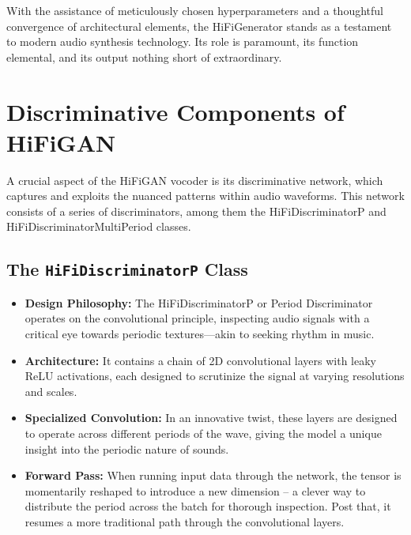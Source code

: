 \documentclass[a4paper]{article}
\begin{document}
With the assistance of meticulously chosen hyperparameters and a thoughtful convergence of architectural elements, the HiFiGenerator stands as a testament to modern audio synthesis technology. Its role is paramount, its function elemental, and its output nothing short of extraordinary.



\section{Discriminative Components of HiFiGAN}

A crucial aspect of the HiFiGAN vocoder is its discriminative network, which captures and exploits the nuanced patterns within audio waveforms. This network consists of a series of discriminators, among them the HiFiDiscriminatorP and HiFiDiscriminatorMultiPeriod classes.

\subsection{The \texttt{HiFiDiscriminatorP} Class}

\begin{itemize}
  
  \item \textbf{Design Philosophy:} The HiFiDiscriminatorP or Period Discriminator operates on the convolutional principle, inspecting audio signals with a critical eye towards periodic textures—akin to seeking rhythm in music.
  
  \item \textbf{Architecture:} It contains a chain of 2D convolutional layers with leaky ReLU activations, each designed to scrutinize the signal at varying resolutions and scales. 
  
  \item \textbf{Specialized Convolution:} In an innovative twist, these layers are designed to operate across different periods of the wave, giving the model a unique insight into the periodic nature of sounds.
  
  \item \textbf{Forward Pass:} When running input data through the network, the tensor is momentarily reshaped to introduce a new dimension -- a clever way to distribute the period across the batch for thorough inspection. Post that, it resumes a more traditional path through the convolutional layers.
  
\end{itemize}
\end{document}
